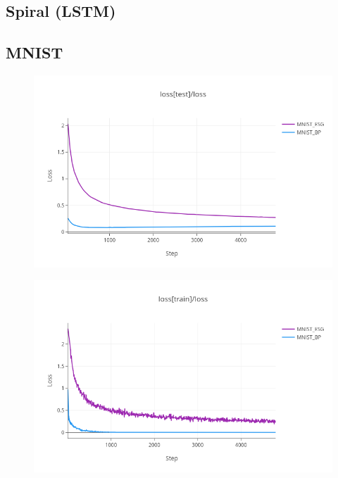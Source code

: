 \documentclass[nohyperref]{article}
\theoremstyle{plain}
\theoremstyle{definition}
\theoremstyle{remark}
\begin{document}
\subsection{Spiral (LSTM)}
\subsection{MNIST}
\begin{figure}[ht]
\vskip 0.2in
\begin{center}
\centerline{\includegraphics[width=\columnwidth]{images/MNIST_test.png}}
\caption{}
\end{center}
\vskip -0.2in
\end{figure}
\begin{figure}[ht]
\vskip 0.2in
\begin{center}
\centerline{\includegraphics[width=\columnwidth]{images/MNIST_train.png}}
\caption{}
\end{center}
\vskip -0.2in
\end{figure}
\end{document}
